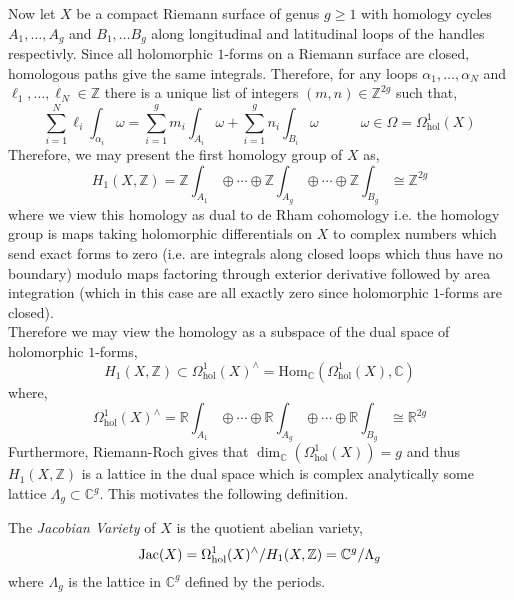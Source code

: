 \documentclass{article}
\newcommand{\Z}{\mathbb{Z}}
\newcommand{\R}{\mathbb{R}}
\newcommand{\C}{\mathbb{C}}
\theoremstyle{definition}
\newenvironment{definition}[1][Definition:]{\begin{trivlist}
\item[\hskip \labelsep {\bfseries #1}]}{\end{trivlist}}
\begin{document}
\newcommand{\Homover}[3]{\mathrm{Hom}_{#1}(#2, #3)}

Now let $X$ be a compact Riemann surface of genus $g \ge 1$ with homology cycles $A_1, \dots, A_g$ and $B_1, \dots B_g$ along longitudinal and latitudinal loops of the handles respectivly. Since all holomorphic $1$-forms on a Riemann surface are closed, homologous paths give the same integrals. Therefore, for any loops $\alpha_1, \dots, \alpha_N$ and $\ell_1, \dots, \ell_N \in \Z$ there is a unique list of integers $(m,n) \in \Z^{2g}$ such that,
\[ \sum_{i = 1}^N \ell_i \int_{\alpha_i} \omega = \sum_{i = 1}^g m_i \int_{A_i} \omega + \sum_{i = 1}^g n_i \int_{B_i} \omega \quad \quad \quad \omega \in \Omega = \Omega^1_{\text{hol}}(X) \]
Therefore, we may present the first homology group of $X$ as,
\[ H_1(X, \Z) = \Z \int_{A_1} \oplus \cdots \oplus \Z \int_{A_g} \oplus \cdots \oplus \Z \int_{B_g} \cong \Z^{2g} \]
where we view this homology as dual to de Rham cohomology i.e. the homology group is maps taking holomorphic differentials on $X$ to complex numbers which send exact forms to zero (i.e. are integrals along closed loops which thus have no boundary) modulo maps factoring through exterior derivative followed by area integration (which in this case are all exactly zero since holomorphic $1$-forms are closed).
\bigskip\\
Therefore we may view the homology as a subspace of the dual space of holomorphic $1$-forms,
\[ H_1(X, \Z) \subset \Omega^1_{\text{hol}}(X)^\wedge = \Homover{\C}{\Omega^1_{\text{hol}}(X)}{\C} \]
where,
\[ \Omega^1_{\text{hol}}(X)^\wedge = \R \int_{A_1} \oplus \cdots \oplus \R \int_{A_g} \oplus \cdots \oplus \R \int_{B_g} \cong \R^{2g} \]
Furthermore, Riemann-Roch gives that $\dim_{\C}(\Omega^1_{\text{hol}}(X)) = g$ and thus $H_1(X, \Z)$ is a lattice in the dual space which is complex analytically some lattice $\Lambda_g \subset \C^g$. This motivates the following definition.
\begin{definition}
The \textit{Jacobian Variety} of $X$ is the quotient abelian variety,
\[  \Jac{X} = \Omega^1_{\text{hol}}(X)^\wedge / H_1(X, \Z) = \C^g / \Lambda_g \]
where $\Lambda_g$ is the lattice in $\C^g$ defined by the periods.
\end{definition}

\newcommand{\Div}{\mathrm{Div}}
\newcommand{\Pic}{\mathrm{Pic}}
\renewcommand{\div}{\mathrm{div}}
\end{document}
